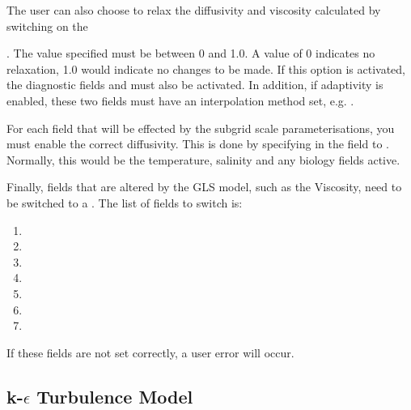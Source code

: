 The user can also choose to relax the diffusivity and viscosity calculated by switching on the\linebreak

. The value specified must be between 0 and 1.0. A value of 0 indicates
no relaxation, 1.0 would indicate no changes to be made. If this option is activated, the diagnostic fields
 and  must also
be activated. In addition, if adaptivity is enabled, these two fields must have an interpolation
method set, e.g. .

For each field that will be effected by the subgrid scale parameterisations, 
you must enable the correct diffusivity. This
is done by specifying  in the
field to . Normally, this would be the temperature, salinity and any biology fields active.

Finally, fields that are altered by the GLS model, such as the Viscosity, need to be switched
to a . The list of fields to switch is:
\begin{enumerate}
\item {}
\item {}
\item {}
\item {}
\item {}
\item {}
\item {}
\end{enumerate}

If these fields are not set correctly, a user error will occur.

\subsection{k-$\epsilon$ Turbulence Model}\label{Sect:kepsilon_usage}

